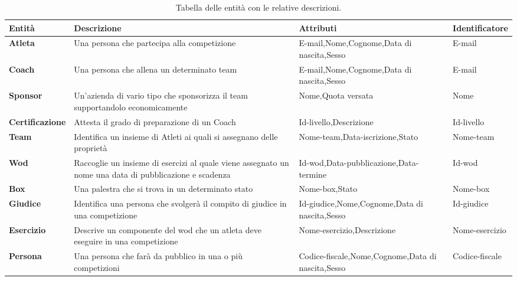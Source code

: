 \documentclass[12pt,a4paper]{article}
\begin{document}
\begin{table}[H]
\scriptsize
\centering
\caption[Entità]{Tabella delle entità con le relative descrizioni.}
\begin{tabularx}{\textwidth}{lXXl}
\toprule
Entità & Descrizione & Attributi & Identificatore \\
\midrule
\textbf{Atleta} & Una persona che partecipa alla competizione & E-mail,Nome,Cognome,Data di nascita,Sesso & E-mail \\
\midrule
\textbf{Coach} & Una persona che allena un determinato team & E-mail,Nome,Cognome,Data di nascita,Sesso & E-mail \\
\midrule
\textbf{Sponsor} & Un'azienda di vario tipo che sponsorizza il team supportandolo economicamente & Nome,Quota versata & Nome \\
\midrule
\textbf{Certificazione} & Attesta il grado di preparazione di un Coach & Id-livello,Descrizione & Id-livello \\
\midrule
\textbf{Team} & Identifica un insieme di Atleti ai quali si assegnano delle proprietà & Nome-team,Data-iscrizione,Stato & Nome-team\\
\midrule
\textbf{Wod} & Raccoglie un insieme di esercizi al quale viene assegnato un nome una data di pubblicazione e scadenza & Id-wod,Data-pubblicazione,Data-termine & Id-wod\\
\midrule
\textbf{Box} & Una palestra che si trova in un determinato stato & Nome-box,Stato & Nome-box\\
\midrule
\textbf{Giudice} & Identifica una persona che svolgerà il compito di giudice in una competizione & Id-giudice,Nome,Cognome,Data di nascita,Sesso & Id-giudice\\
\midrule
\textbf{Esercizio} & Descrive un componente del wod che un atleta deve eseguire in una competizione & Nome-esercizio,Descrizione & Nome-esercizio\\
\midrule
\textbf{Persona} & Una persona che farà da pubblico in una o più competizioni & Codice-fiscale,Nome,Cognome,Data di nascita,Sesso & Codice-fiscale\\
\bottomrule
\end{tabularx}
\end{table}
\end{document}
